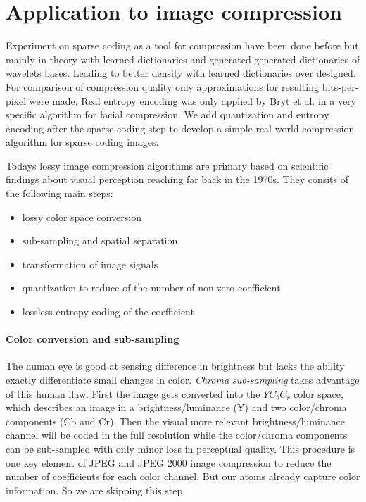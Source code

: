 \section{Application to image compression}
\label{sec:compression}
Experiment on sparse coding as a tool for compression have been done
before\cite{Lewicki1999,Murray2006} but mainly in theory with learned
dictionaries and generated generated dictionaries of wavelets bases. Leading to
better density with learned dictionaries over designed. For comparison of
compression quality only approximations for resulting bits-per-pixel were
made. Real entropy encoding was only applied by Bryt et al.\cite{Bryt2008} in
a very specific algorithm for facial compression. We add quantization and
entropy encoding after the sparse coding step to develop a simple real world
compression algorithm for sparse coding images.

Todays lossy image compression algorithms are primary based on scientific
findings about visual perception reaching far back in the 1970s.
They consits of the following main steps:
\begin{itemize}
 \item lossy color space conversion
 \item sub-sampling and spatial separation
 \item transformation of image signals
 \item quantization to reduce of the number of non-zero coefficient 
 \item lossless entropy coding of the coefficient 
\end{itemize}

\paragraph{Color conversion and sub-sampling} The human eye is good at sensing
difference in brightness but lacks the ability exactly differentiate small
changes in color. \emph{Chroma sub-sampling} takes advantage of this human flaw.
First the image gets converted into the $YC_bC_r$ color space, which describes
an image in a brightness/luminance (Y) and two color/chroma components (Cb and
Cr). Then the visual more relevant brightness/luminance channel will be coded in
the full resolution while the color/chroma components can be sub-sampled with
only minor loss in perceptual quality. This procedure is one key element of JPEG
and JPEG 2000 image compression to reduce the number of coefficients for each
color channel. But our atoms already capture color information. So we are
skipping this step. 

